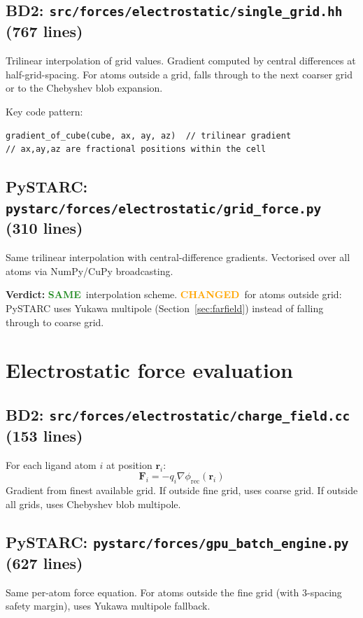 \documentclass[11pt]{article}
\newcommand{\same}{\textcolor{ForestGreen}{\textbf{SAME}}}
\newcommand{\changed}{\textcolor{Orange}{\textbf{CHANGED}}}
\begin{document}
\subsection{BD2: \texttt{src/forces/electrostatic/single\_grid.hh} (767 lines)}
Trilinear interpolation of grid values. Gradient computed by central
differences at half-grid-spacing. For atoms outside a grid, falls
through to the next coarser grid or to the Chebyshev blob expansion.

Key code pattern:
\begin{lstlisting}
gradient_of_cube(cube, ax, ay, az)  // trilinear gradient
// ax,ay,az are fractional positions within the cell
\end{lstlisting}

\subsection{PySTARC: \texttt{pystarc/forces/electrostatic/grid\_force.py} (310 lines)}
Same trilinear interpolation with central-difference gradients.
Vectorised over all atoms via NumPy/CuPy broadcasting.

\textbf{Verdict:} \same\ interpolation scheme.
\changed\ for atoms outside grid: PySTARC uses Yukawa multipole (Section~\ref{sec:farfield})
instead of falling through to coarse grid.


\section{Electrostatic force evaluation}

\subsection{BD2: \texttt{src/forces/electrostatic/charge\_field.cc} (153 lines)}
For each ligand atom $i$ at position $\mathbf{r}_i$:
\begin{equation}
\mathbf{F}_i = -q_i \nabla\phi_\mathrm{rec}(\mathbf{r}_i)
\end{equation}
Gradient from finest available grid. If outside fine grid, uses coarse grid.
If outside all grids, uses Chebyshev blob multipole.

\subsection{PySTARC: \texttt{pystarc/forces/gpu\_batch\_engine.py} (627 lines)}
Same per-atom force equation. For atoms outside the fine grid (with 3-spacing
safety margin), uses Yukawa multipole fallback.
\end{document}
